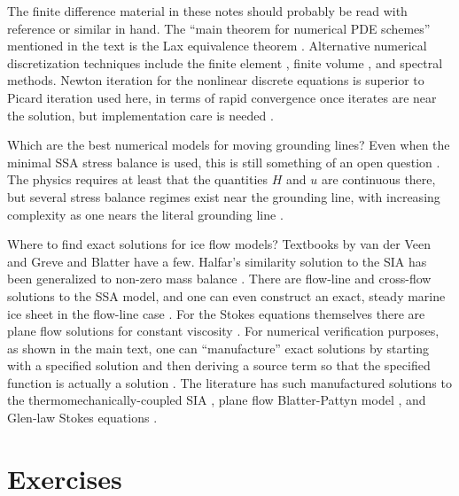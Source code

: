 \documentclass[letterpaper,final,12pt,reqno]{amsart}
\begin{document}
The finite difference material in these notes should probably be read with reference \cite{MortonMayers} or similar in hand.  The ``main theorem for numerical PDE schemes'' mentioned in the text is the Lax equivalence theorem \cite{MortonMayers}.  Alternative numerical discretization techniques include the finite element \cite{Braess}, finite volume \cite{LeVeque}, and spectral \cite{Trefethen} methods.  Newton iteration for the nonlinear discrete equations is superior to Picard iteration used here, in terms of rapid convergence once iterates are near the solution, but implementation care is needed \cite{Kelley}.

Which are the best numerical models for moving grounding lines?  Even when the minimal SSA stress balance is used, this is still something of an open question \cite{Feldmannetal2014,Goldbergetal2009,MISMIP3d2013,MISMIP2012,SchoofMarine1}.  The physics requires at least that the quantities $H$ and $u$ are continuous there, but several stress balance regimes exist near the grounding line, with increasing complexity as one nears the literal grounding line \cite{SchoofMarine2}.

Where to find exact solutions for ice flow models?  Textbooks by van der Veen \cite{vanderVeen} and Greve and Blatter \cite{GreveBlatter2009} have a few.  Halfar's similarity solution to the SIA \cite{Halfar81,Halfar83} has been generalized to non-zero mass balance \cite{BLKCB}.  There are flow-line \cite{Bodvardsson,vanderVeen83} and cross-flow \cite{SchoofStream} solutions to the SSA model, and one can even construct an exact, steady marine ice sheet in the flow-line case \cite{Bueler2014exactmarine}.  For the Stokes equations themselves there are plane flow solutions for constant viscosity \cite{BaliseRaymond1985}.  For numerical verification purposes, as shown in the main text, one can ``manufacture'' exact solutions by starting with a specified solution and then deriving a source term so that the specified function is actually a solution \cite{Roache}.  The literature has such manufactured solutions to the thermomechanically-coupled SIA \cite{BBL}, plane flow Blatter-Pattyn model \cite{GlowinskiRappaz}, and Glen-law Stokes equations \cite{JouvetRappaz2011,Lengetal2012,SargentFastook2010}.

\footnotesize

\bigskip
\bigskip
%
%


\bigskip
\bigskip
\small
\section*{Exercises}
\end{document}
